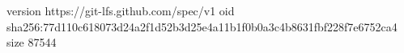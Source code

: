 version https://git-lfs.github.com/spec/v1
oid sha256:77d110c618073d24a2f1d52b3d25e4a11b1f0b0a3c4b8631fbf228f7e6752ca4
size 87544
